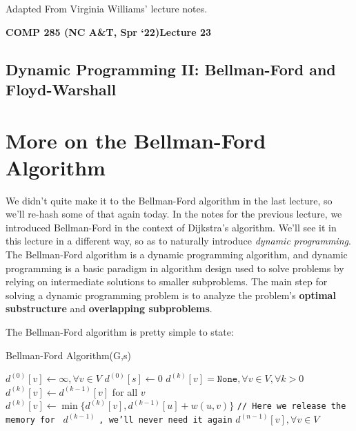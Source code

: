 \documentclass [12pt]{article}
\theoremstyle{definition}
\begin{document}
 

\vspace {1em} 
\begin {Instruction} 
Adapted From Virginia Williams' lecture notes.
\end {Instruction}  

{\LARGE \textbf {COMP 285 (NC A\&T, Spr `22)}\hfill \textbf {Lecture 23} } 

\begin{centering}
\section*{Dynamic Programming II: Bellman-Ford and Floyd-Warshall}
\end{centering}


\section{More on the Bellman-Ford Algorithm}
 
We didn't quite make it to the Bellman-Ford algorithm in the last lecture, so we'll re-hash some of that again today. In the notes for the previous lecture, we introduced Bellman-Ford in the context of Dijkstra's algorithm. We'll see it in this lecture in a different way, so as to naturally introduce \textit{dynamic programming}. The Bellman-Ford algorithm is a dynamic programming algorithm, and dynamic programming is a basic paradigm in algorithm design used to solve problems by relying on intermediate solutions to smaller subproblems. The main step for solving a dynamic programming problem is to analyze the problem's \textbf{optimal substructure} and \textbf{overlapping subproblems}. 

The Bellman-Ford algorithm is pretty simple to state:

\begin{algorithm}
\caption{Bellman-Ford Algorithm(G,s)}
\label{alg:bellman-ford}
\begin{algorithmic}
\STATE $d^{(0)}[v] \gets \infty, \forall v \in V$
\STATE $d^{(0)}[s] \gets 0$
\STATE $d^{(k)}[v] = \texttt{None}, \forall v \in V, \forall k > 0$
  \STATE $d^{(k)}[v] \gets d^{(k-1)}[v]$ for all $v$
    \STATE $d^{(k)}[v] \gets \min\{d^{(k)}[v], d^{(k-1)}[u] + w(u,v) \}$ 
  \ENDFOR
  \STATE \texttt{// Here we release the memory for } $d^{(k-1)}$ \texttt{, we'll never need it again}
\ENDFOR
\RETURN $d^{(n-1)}[v], \forall v \in V$
\end{algorithmic}
\end{algorithm}
\end{document}
